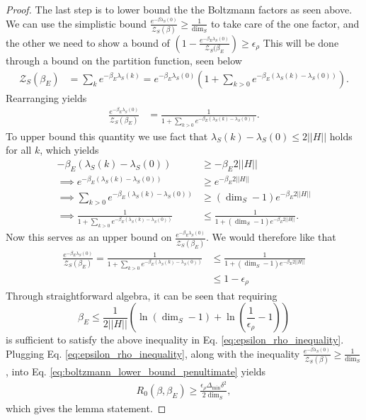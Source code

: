 \documentclass{article}
\newcommand{\parens}[1]{\left( #1 \right)}
\newcommand{\norm}[1]{\left| \left| #1 \right| \right|}
\newcommand{\partfun}{\mathcal{Z}}
\begin{document}
\begin{proof}
    The last step is to lower bound the the Boltzmann factors as seen above. We can use the simplistic bound $\frac{e^{-\beta \lambda_S(0)}}{\partfun_S(\beta)} \geq \frac{1}{\dim_S}$ to take care of the one factor, and the other we need to show a bound of $\parens{1 - \frac{e^{-\beta_E \lambda_S(0)}}{\partfun_S(\beta_E}} \geq \epsilon_{\rho}$
    This will be done through a bound on the partition function, seen below
    \begin{align}
        \partfun_S(\beta_E) &=  \sum_k e^{-\beta_E \lambda_S(k)} = e^{-\beta_E \lambda_S(0)} \parens{1 + \sum_{k > 0} e^{-\beta_E (\lambda_S(k) - \lambda_S(0))}}.
    \end{align}
    Rearranging yields
    \begin{align}
        \frac{e^{-\beta_E \lambda_S(0)}}{\partfun_S(\beta_E)} &= \frac{1}{1 + \sum_{k > 0} e^{-\beta_E (\lambda_S(k) - \lambda_S(0))}}.
    \end{align}
    To upper bound this quantity we use fact that $\lambda_S(k) - \lambda_S(0) \leq 2 \norm{H}$ holds for all $k$, which yields
    \begin{align}
        -\beta_E(\lambda_S(k) - \lambda_S(0)) &\geq -\beta_E 2 \norm{H} \\
        \implies e^{-\beta_E (\lambda_S(k) - \lambda_S(0))} &\geq e^{-\beta_E 2 \norm{H}} \\
        \implies \sum_{k > 0} e^{-\beta_E (\lambda_S(k) - \lambda_S(0))} &\geq (\dim_S - 1) e^{-\beta_E 2 \norm{H}} \\
        \implies \frac{1}{1 + \sum_{k > 0} e^{-\beta_E (\lambda_S(k) - \lambda_S(0))} } &\leq \frac{1} {1 + (\dim_S - 1) e^{-\beta_E 2 \norm{H}} } .
    \end{align}
    Now this serves as an upper bound on $\frac{e^{-\beta_E \lambda_S(0)}}{\partfun_S(\beta_E)}$. We would therefore like that 
    \begin{align}
        \frac{e^{-\beta_E \lambda_S(0)}}{\partfun_S(\beta_E)} = \frac{1}{1 + \sum_{k > 0} e^{-\beta_E (\lambda_S(k) - \lambda_S(0))}} &\leq \frac{1}{1 + (\dim_S - 1) e^{-\beta_E 2 \norm{H}}} \\
        &\leq 1 - \epsilon_{\rho} \label{eq:epsilon_rho_inequality}
    \end{align}
    Through straightforward algebra, it can be seen that requiring 
    \begin{equation}
        \beta_E \leq \frac{1}{2 \norm{H}} \parens{\ln (\dim_S - 1) + \ln \left( \frac{1}{\epsilon_{\rho}} - 1\right) } \label{eq:beta_e_upper_bound_thermal_diffs}
    \end{equation}
    is sufficient to satisfy the above inequality in Eq. \eqref{eq:epsilon_rho_inequality}. Plugging Eq. \eqref{eq:epsilon_rho_inequality}, along with the inequality $\frac{e^{-\beta \lambda_S(0)}}{\partfun_S(\beta)} \geq \frac{1}{\dim_S}$, into Eq. \eqref{eq:boltzmann_lower_bound_penultimate} yields
    \begin{align}
        R_0(\beta, \beta_E) \geq \frac{\epsilon_{\rho} \Delta_{\min} \delta^2}{2 \dim_S},
    \end{align}
    which gives the lemma statement. 
    
\end{proof}
\end{document}
